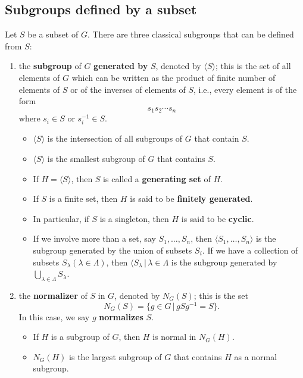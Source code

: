 \subsection*{Subgroups defined by a subset}
Let $S$ be a subset of $G$. There are three classical subgroups that can be defined from $S$:
\begin{enumerate}[(1)]
	\item the \textbf{subgroup} of $G$ \textbf{generated by} $S$, denoted by $\langle S\rangle$; this is the set of all elements of $G$ which can be written as the product of finite number of elements of $S$ or of the inverses of elements of $S$, i.e., every element is of the form
	\begin{equation*}
		s_1s_2\cdots s_n
	\end{equation*}
	where $s_i\in S$ or $s_i^{-1}\in S$. 
	\begin{itemize}
		\item $\langle S\rangle$ is the intersection of all subgroups of $G$ that contain $S$.
		\item $\langle S\rangle$ is the smallest subgroup of $G$ that contains $S$.
		\item If $H = \langle S\rangle$, then  $S$ is called a \textbf{generating set} of $H$. 
		\item If $S$ is a finite set, then $H$ is said to be \textbf{finitely generated}.
		\item  In particular, if $S$ is a singleton, then $H$ is said to be \textbf{cyclic}.
		\item If we involve more than a set, say $S_1,\dots, S_n$, then $\langle S_1,\dots, S_n\rangle$ is the subgroup generated by the union of subsets $S_i$. If we have a collection of subsets $S_\lambda (\lambda\in \Lambda)$, then $\langle S_\lambda \,|\, \lambda\in \Lambda$ is the subgroup generated by $\bigcup_{\lambda\in \Lambda} S_\lambda$.
	\end{itemize}
	\item the \textbf{normalizer} of $S$ in $G$, denoted by $N_G(S)$; this is the set
	\begin{equation*}
		N_G(S) = \{g\in G\,|\, gSg^{-1}= S\}.
	\end{equation*}
	In this case, we say $g$ \textbf{normalizes} $S$.
	\begin{itemize}
		\item If $H$ is a subgroup of $G$, then $H$ is normal in $	N_G(H)$.
		\item $N_G(H)$ is the largest subgroup of $G$ that contains $H$ as a normal subgroup.

\end{itemize}
\end{enumerate}
